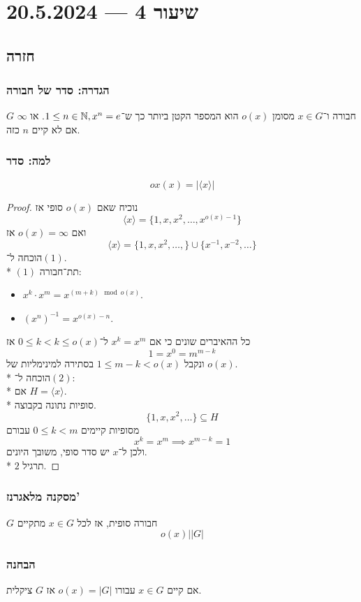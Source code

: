 \section{שיעור 4 --- 20.5.2024}
\subsection{חזרה}
\subsubsection{הגדרה: סדר של חבורה}
$G$ חבורה ו־$x \in G$ מסומן $o(x)$ הוא המספר הקטן ביותר כך ש־$1 \le n \in \mathbb{N}, x^n = e$. או $\infty$ אם לא קיים $n$ כזה.

\subsubsection{למה: סדר}
\[
	ox(x) = | \langle x\rangle|
\]
\begin{proof}
	נוכיח שאם $o(x)$ סופי אז
	\[
		\langle x \rangle = \{ 1, x, x^2, \hdots, x^{o(x) - 1} \} \tag{1}
	\]
	ואם $o(x) = \infty$ אז
	\[
		\langle x \rangle = \{ 1, x, x^2, \hdots, \} \cup \{ x^{-1}, x^{-2}, \hdots \} \tag{2}
	\]
	הוכחה ל־$(1)$. \\*
	$(1)$ תת־חבורה:
	\begin{itemize}
		\item $x^k \cdot x^m = x^{(m + k) \mod o(x)}$.
		\item ${(x^n)}^{-1} = x^{o(x) - n}$.
	\end{itemize}
	כל ההאיברים שונים כי אם $x^k = x^m$ ל־$0 \le k < k \le o(x)$ אז
	\[
		1 = x^0 = m^{m - k}
	\]
	ונקבל $1 \le m - k < o(x)$ בסתירה למינימליות של $o(x)$. \\*
	הוכחה ל־$(2)$: \\*
	אם $H = \langle x \rangle$. \\*
	סופיות נתונה בקבוצה.
	\[
		\{1, x, x^2, \hdots \} \subseteq H
	\]
	מסופיות קיימים $0 \le k < m$ עבורם
	\[
		x^k = x^m \implies x^{m - k} = 1
	\]
	ולכן ל־$x$ יש סדר סופי, משובך היונים. \\*
	$2$ תרגיל.
\end{proof}

\subsubsection{מסקנה מלאגרנז'}
$G$ חבורה סופית, אז לכל $x \in G$ מתקיים
\[
	o(x) \Big| |G|
\]

\subsubsection{הבחנה}
אם קיים $x \in G$ עבורו $o(x) = |G|$ אז $G$ ציקלית.

